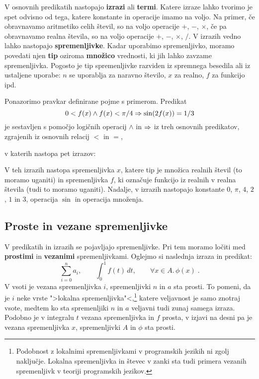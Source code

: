 V osnovnih predikatih nastopajo \textbf{izrazi} ali \textbf{termi}. Katere
izraze lahko tvorimo je spet odvisno od tega, katere konstante in
operacije imamo na voljo. Na primer, če obravnavamo aritmetiko celih
števil, so na voljo operacije $+$, $-$, $\times$, če pa obravnavamo
realna števila, so na voljo operacije $+$, $-$, $\times$, $/$. V
izrazih vedno lahko nastopajo \textbf{spremenljivke}. Kadar uporabimo
spremenljivko, moramo povedati njen \textbf{tip} oziroma \textbf{množico}
vrednosti, ki jih lahko zavzame spremenljivka. Pogosto je tip
spremenljivke razviden iz spremnega besedila ali iz ustaljene uporabe:
$n$ se uporablja za naravno število, $x$ za realno, $f$ za funkcijo
ipd.

Ponazorimo pravkar definirane pojme s primerom. Predikat
%
\begin{equation*}
  0 < f(x) \land f(x) < \pi/4 \Rightarrow \sin(2 f(x)) = 1/3
\end{equation*}
%
je sestavljen s pomočjo logičnih operacij $\land$ in $\Rightarrow$ iz treh
osnovnih predikatov, zgrajenih iz osnovnih relacij $<$ in $=$,
%
%
v katerih nastopa pet izrazov:
%
%
V teh izrazih nastopa spremenljivka $x$, katere tip je množica
realnih števil (to moramo uganiti) in spremenljivka $f$, ki označuje
funkcijo iz realnih v realna števila (tudi to moramo uganiti).
Nadalje, v izrazih nastopajo konstante $0$, $\pi$, $4$, $2$,
$1$ in $3$, operacija $\sin$ in operacija množenja.


\subsection{Proste in vezane spremenljivke}
\label{sec:spremenljivke}

V predikatih in izrazih se pojavljajo spremenljivke. Pri tem moramo
ločiti med \textbf{prostimi} in \textbf{vezanimi} spremenljivkami. Oglejmo
si naslednja izraza in predikat:
%
\begin{equation*}
  \sum_{i=0}^{n} a_i,
  \qquad
  \int_0^1 f(t) \, d t,
  \qquad
  \forall x \in A .\, \phi(x) \;.
\end{equation*}
%
V vsoti je vezana spremenljivka $i$, spremenljivki $n$ in $a$ sta
prosti. To pomeni, da je $i$ neke vrste ">lokalna
spremenljivka"<,\footnote{Podobnost z lokalnimi spremenljivkami v
  programskih jezikih ni zgolj naključje. Lokalna spremenljivka in
  števec v zanki sta tudi primera vezanih spremenljivk v teoriji
  programskih jezikov.} katere veljavnost je samo znotraj vsote,
medtem ko sta spremenljiki $n$ in $a$ veljavni tudi zunaj samega
izraza. Podobno je v integralu $t$ vezana spremenljivka in $f$ prosta,
v izjavi na desni pa je vezana spremenljivka $x$, spremenljivki $A$ in
$\phi$ sta prosti.

